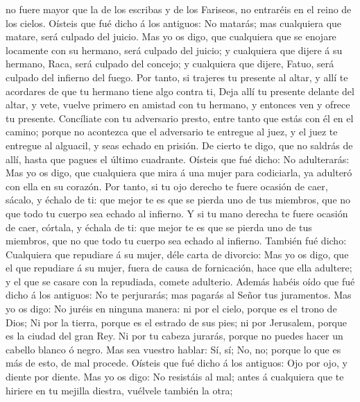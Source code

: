 no fuere mayor que la de los escribas y de los Fariseos, no entraréis en
el reino de los cielos.  Oísteis que fué dicho á los
antiguos: No matarás; mas cualquiera que matare, será culpado del
juicio.  Mas yo os digo, que cualquiera que se enojare
locamente con su hermano, será culpado del juicio; y cualquiera que
dijere á su hermano, Raca, será culpado del concejo; y cualquiera que
dijere, Fatuo, será culpado del infierno del fuego.  Por
tanto, si trajeres tu presente al altar, y allí te acordares de que tu
hermano tiene algo contra ti,  Deja allí tu presente
delante del altar, y vete, vuelve primero en amistad con tu hermano, y
entonces ven y ofrece tu presente.  Concíliate con tu
adversario presto, entre tanto que estás con él en el camino; porque no
acontezca que el adversario te entregue al juez, y el juez te entregue
al alguacil, y seas echado en prisión.  De cierto te
digo, que no saldrás de allí, hasta que pagues el último cuadrante.
 Oísteis que fué dicho: No adulterarás: 
Mas yo os digo, que cualquiera que mira á una mujer para codiciarla, ya
adulteró con ella en su corazón.  Por tanto, si tu ojo
derecho te fuere ocasión de caer, sácalo, y échalo de ti: que mejor te
es que se pierda uno de tus miembros, que no que todo tu cuerpo sea
echado al infierno.  Y si tu mano derecha te fuere
ocasión de caer, córtala, y échala de ti: que mejor te es que se pierda
uno de tus miembros, que no que todo tu cuerpo sea echado al infierno.
 También fué dicho: Cualquiera que repudiare á su mujer,
déle carta de divorcio:  Mas yo os digo, que el que
repudiare á su mujer, fuera de causa de fornicación, hace que ella
adultere; y el que se casare con la repudiada, comete adulterio.
 Además habéis oído que fué dicho á los antiguos: No te
perjurarás; mas pagarás al Señor tus juramentos.  Mas yo
os digo: No juréis en ninguna manera: ni por el cielo, porque es el
trono de Dios;  Ni por la tierra, porque es el estrado de
sus pies; ni por Jerusalem, porque es la ciudad del gran Rey.
 Ni por tu cabeza jurarás, porque no puedes hacer un
cabello blanco ó negro.  Mas sea vuestro hablar: Sí, sí;
No, no; porque lo que es más de esto, de mal procede. 
Oísteis que fué dicho á los antiguos: Ojo por ojo, y diente por diente.
 Mas yo os digo: No resistáis al mal; antes á cualquiera
que te hiriere en tu mejilla diestra, vuélvele también la otra;
